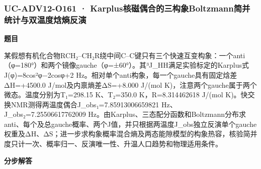 \documentclass[UTF8,11pt,a4paper]{ctexart}
\begin{document}
\subsubsection*{UC-ADV12-O161 · Karplus核磁偶合的三构象Boltzmann简并统计与双温度焓熵反演}
\noindent\textbf{题目}\par
某假想有机化合物RCH₂–CH₂R绕中间C–C键只有三个快速互变构象：一个anti（φ=180°）和两个镜像gauche（φ=±60°）。其³J\_HH满足实验标定的Karplus式J(φ)=8cos²φ−2cosφ+2 Hz。相对单个anti构象，每一个gauche具有固定焓差ΔH=+4500.0 J/mol及内禀熵差ΔS=+8.000 J/(mol K)，注意两个gauche属于两个微态。温度分别为T₁=298.15 K、T₂=350.0 K，R=8.314462618 J/(mol K)。快交换NMR测得两温度偶合J\_obs₁=7.85913006659821 Hz、J\_obs₂=7.25506617762009 Hz。由Karplus、三态配分函数和Boltzmann分布求anti、每个及总gauche概率、两个J值，并只根据两温度J\_obs独立反演单个gauche权重及ΔH、ΔS；进一步求构象概率混合熵及两态能隙模型的构象热容，核验简并度只计一次、概率归一、反演唯一性、升温人口趋势和物理适用条件。\par
\medskip\noindent\textbf{分步解答}
\end{document}
